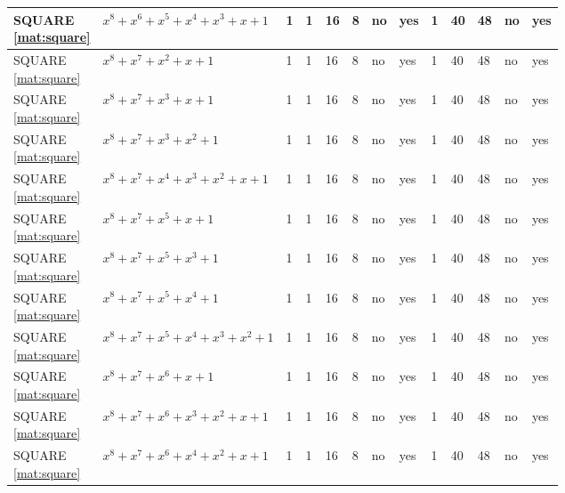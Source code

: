 \begin{tiny}
\begin{longtable}{|l|l|l|l|l|l|l|l|l|l|l|l|l|}
\shortstack{SQUARE \\ \eqref{mat:square}} & $x^8 + x^6 + x^5 + x^4 + x^3 + x + 1$ & 1 & 1 & 16 & 8 & no & yes & 1 & 40 & 48 & no & yes \\ \hline
\shortstack{SQUARE \\ \eqref{mat:square}} & $x^8 + x^7 + x^2 + x + 1$ & 1 & 1 & 16 & 8 & no & yes & 1 & 40 & 48 & no & yes \\ \hline
\shortstack{SQUARE \\ \eqref{mat:square}} & $x^8 + x^7 + x^3 + x + 1$ & 1 & 1 & 16 & 8 & no & yes & 1 & 40 & 48 & no & yes \\ \hline
\shortstack{SQUARE \\ \eqref{mat:square}} & $x^8 + x^7 + x^3 + x^2 + 1$ & 1 & 1 & 16 & 8 & no & yes & 1 & 40 & 48 & no & yes \\ \hline
\shortstack{SQUARE \\ \eqref{mat:square}} & $x^8 + x^7 + x^4 + x^3 + x^2 + x + 1$ & 1 & 1 & 16 & 8 & no & yes & 1 & 40 & 48 & no & yes \\ \hline
\shortstack{SQUARE \\ \eqref{mat:square}} & $x^8 + x^7 + x^5 + x + 1$ & 1 & 1 & 16 & 8 & no & yes & 1 & 40 & 48 & no & yes \\ \hline
\shortstack{SQUARE \\ \eqref{mat:square}} & $x^8 + x^7 + x^5 + x^3 + 1$ & 1 & 1 & 16 & 8 & no & yes & 1 & 40 & 48 & no & yes \\ \hline
\shortstack{SQUARE \\ \eqref{mat:square}} & $x^8 + x^7 + x^5 + x^4 + 1$ & 1 & 1 & 16 & 8 & no & yes & 1 & 40 & 48 & no & yes \\ \hline
\shortstack{SQUARE \\ \eqref{mat:square}} & $x^8 + x^7 + x^5 + x^4 + x^3 + x^2 + 1$ & 1 & 1 & 16 & 8 & no & yes & 1 & 40 & 48 & no & yes \\ \hline
\shortstack{SQUARE \\ \eqref{mat:square}} & $x^8 + x^7 + x^6 + x + 1$ & 1 & 1 & 16 & 8 & no & yes & 1 & 40 & 48 & no & yes \\ \hline
\shortstack{SQUARE \\ \eqref{mat:square}} & $x^8 + x^7 + x^6 + x^3 + x^2 + x + 1$ & 1 & 1 & 16 & 8 & no & yes & 1 & 40 & 48 & no & yes \\ \hline
\shortstack{SQUARE \\ \eqref{mat:square}} & $x^8 + x^7 + x^6 + x^4 + x^2 + x + 1$ & 1 & 1 & 16 & 8 & no & yes & 1 & 40 & 48 & no & yes \\ \hline

\end{longtable}
\end{tiny}
